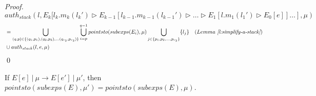 \documentclass{llncs}
\begin{document}
\begin{proof}
\noindent$auth_{stack}(l, E_k[l_k.m_k(l_k') \rhd E_{k-1}[l_{k-1}.m_{k-1}(l_{k-1}') \rhd \dots \rhd E_1[l.m_1(l_1') \rhd E_0[e]] \dots ], \mu)$
\vspace{-7pt}
\begin{align*}
&=  \bigcup_{(q, p) \in \{ (q_1, p_1), (q_2, p_2), \dots (q_{r_2}, p_{r_2}) \}} \bigcup^{q-1}_{i = p} pointsto(subexps(E_i), \mu) \bigcup_{j \in \{ p_1, p_2, \dots, p_{r_2} \}} \{ l_j \} & (Lemma~\textit{\ref{l:simplify-a-stack}})\\
&\cup auth_{stack}(l, e, \mu)
\end{align*}
\qed
\end{proof}


\begin{mdframed}
\begin{lemma}
\label{l:pt-ses}
If $E[e]~|~\mu \longrightarrow E[e']~|~\mu'$, then $pointsto(subexps(E), \mu') = pointsto(subexps(E), \mu)$.
\end{lemma}
\end{mdframed}
\end{document}

